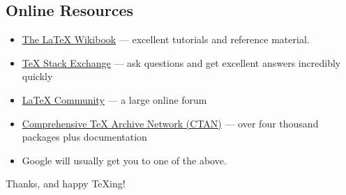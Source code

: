 \documentclass{beamer}
\begin{document}
\subsection{Online Resources}
\begin{frame}{\insertsubsection}
\begin{itemize}
\item \href{http://en.wikibooks.org/wiki/LaTeX}{The \LaTeX{} Wikibook} ---
excellent tutorials and reference material.
\item \href{http://tex.stackexchange.com/}{\TeX{} Stack Exchange} --- ask
questions and get excellent answers incredibly quickly
\item \href{http://www.latex-community.org/}{\LaTeX{} Community} --- a large
online forum
\item \href{http://ctan.org/}{Comprehensive \TeX{} Archive Network (CTAN)} ---
over four thousand packages plus documentation
\item Google will usually get you to one of the above.
\end{itemize}
\end{frame}

\begin{frame}
\begin{center}
Thanks, and happy \TeX{}ing!
\end{center}
\end{frame}
\end{document}

